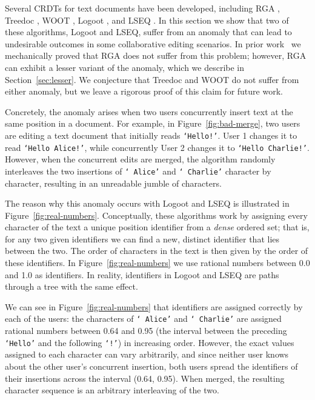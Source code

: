 \documentclass[sigconf]{acmart}
\begin{document}
Several CRDTs for text documents have been developed, including RGA \cite{Roh:2011dw}, Treedoc \cite{Preguica:2009fz}, WOOT \cite{Oster:2006wj}, Logoot \cite{Weiss:2009ht,Weiss:2010hx}, and LSEQ \cite{Nedelec:2013ky,Nedelec:2016eo}.
In this section we show that two of these algorithms, Logoot and LSEQ, suffer from an anomaly that can lead to undesirable outcomes in some collaborative editing scenarios.
In prior work~\cite{ExtendedVersion,AFP} we mechanically proved that RGA does not suffer from this problem; however, RGA can exhibit a lesser variant of the anomaly, which we describe in Section~\ref{sec:lesser}.
We conjecture that Treedoc and WOOT do not suffer from either anomaly, but we leave a rigorous proof of this claim for future work.

Concretely, the anomaly arises when two users concurrently insert text at the same position in a document.
For example, in Figure~\ref{fig:bad-merge}, two users are editing a text document that initially reads \texttt{`Hello!'}.
User 1 changes it to read \texttt{`Hello Alice!'}, while concurrently User 2 changes it to \texttt{`Hello Charlie!'}.
However, when the concurrent edits are merged, the algorithm randomly interleaves the two insertions of \texttt{`~Alice'} and \texttt{`~Charlie'} character by character, resulting in an unreadable jumble of characters.

The reason why this anomaly occurs with Logoot and LSEQ is illustrated in Figure~\ref{fig:real-numbers}.
Conceptually, these algorithms work by assigning every character of the text a unique position identifier from a \emph{dense} ordered set; that is, for any two given identifiers we can find a new, distinct identifier that lies between the two.
The order of characters in the text is then given by the order of these identifiers.
In Figure~\ref{fig:real-numbers} we use rational numbers between 0.0 and 1.0 as identifiers.
In reality, identifiers in Logoot and LSEQ are paths through a tree with the same effect.

We can see in Figure~\ref{fig:real-numbers} that identifiers are assigned correctly by each of the users: the characters of \texttt{` Alice'} and \texttt{` Charlie'} are assigned rational numbers between 0.64 and 0.95 (the interval between the preceding \texttt{`Hello'} and the following \texttt{`!'}) in increasing order.
However, the exact values assigned to each character can vary arbitrarily, and since neither user knows about the other user's concurrent insertion, both users spread the identifiers of their insertions across the interval (0.64, 0.95).
When merged, the resulting character sequence is an arbitrary interleaving of the two.
\end{document}
